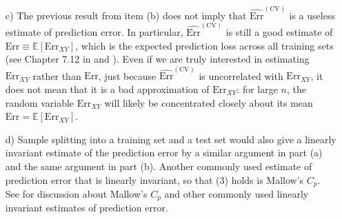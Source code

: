 \begin{enumerate}
\item[c)] The previous result from item (b) does not imply that $\widehat{\text{Err}}^{(\text{CV})}$ is a useless estimate of prediction error. In particular,  $\widehat{\text{Err}}^{(\text{CV})}$ is still a good estimate of $\text{Err} \equiv \mathbb{E}[ \text{Err}_{XY} ]$, which is the expected prediction loss across all training sets (see Chapter 7.12 in \cite{hastie2009elements} and \cite{Bates2022CrossVal}). Even if we are truly interested in estimating $\text{Err}_{XY}$ rather than $\text{Err}$, just because $\widehat{\text{Err}}^{(\text{CV})}$ is uncorrelated with  $\text{Err}_{XY}$, it does not mean that it is a bad approximation of $\text{Err}_{XY}$: for large $n$, the random variable $\text{Err}_{XY}$ will likely be concentrated closely about its mean $\text{Err}=\mathbb{E}[ \text{Err}_{XY} ]$.


\item[d)] Sample splitting into a training set and a test set would also give a linearly invariant estimate of the prediction error by a similar argument in part (a) and the same argument in part (b). Another commonly used estimate of prediction error that is linearly invariant, so that (3) holds is Mallow's $C_p$. See \cite{Bates2022CrossVal} for discussion about Mallow's $C_p$ and other commonly used linearly invariant estimates of prediction error.

\end{enumerate}